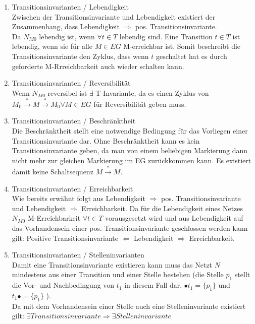 \documentclass[10pt]{scrartcl}
\begin{document}
\begin{enumerate}
\item{Transitionsinvarianten / Lebendigkeit}\\
Zwischen der Transitionsinvariante und Lebendigkeit existiert der Zusammenhang, dass Lebendigkeit $\Rightarrow$ pos. Transitionsinvariante.\\
Da $N_{M0}$ lebendig ist, wenn $\forall t \in T$ lebendig sind.
Eine Transition $t \in T$ ist lebendig, wenn sie für alle $M \in EG$ M-erreichbar ist.
Somit beschreibt die Transitionsinvariante den Zyklus, dass wenn $t$ geschaltet hat es durch geforderte M-Rrreichbarkeit auch wieder schalten kann. 

\item{Transitionsinvarianten / Reversibilität}\\
Wenn $N_{M0}$ reversibel ist $\exists$ T-Invariante, da es einen Zyklus von $M_{0} \overset{*}{\rightarrow} M  \overset{*}{\rightarrow} M_{0}  \forall M \in EG$ für Reversibilität geben muss.

\item{Transitionsinvarianten / Beschränktheit}\\
Die Beschränktheit stellt eine notwendige Bedingung für das Vorliegen einer Transitionsinvariante dar.
Ohne Beschränktheit kann es kein Transitionsinvariante geben, da man von einem beliebigen Markierung dann nicht mehr zur gleichen Markierung im EG zurückkommen kann.
Es existiert damit keine Schaltsequenz $M \overset{*}{\rightarrow} M$.

\item{Transitionsinvarianten / Erreichbarkeit}\\
Wie bereits erwähnt folgt aus Lebendigkeit $\Rightarrow$ pos. Transitionsinvariante und Lebendigkeit $\Rightarrow$ Erreichbarkeit. 
Da für die Lebendigkeit eines Netzes $N_{M0}$ M-Erreichbarkeit $\forall t \in T$ vorausgesetzt wird und aus Lebendigkeit auf das Vorhandensein einer pos. Transitionsinvariante geschlossen werden kann gilt: Positive Transitionsinvariante $\Leftarrow$ Lebendigkeit $\Rightarrow$ Erreichbarkeit.

\item{Transitionsinvarianten / Stelleninvarianten}\\
Damit eine Transitionsinvariante existieren kann muss das Netzt $N$ mindestens aus einer Transition und einer Stelle bestehen (die Stelle $p_{1}$ stellt die Vor- und Nachbedingung von $t_{1}$ in diesem Fall dar, $\bullet t_{1} = \{p_{1}\}$ und $t_{1} \bullet = \{p_{1}\}$ ).\\
Da mit dem Vorhandensein einer Stelle auch eine Stelleninvariante existiert gilt: $\exists Transitionsinvariante \Rightarrow \exists Stelleninvariante$


\end{enumerate}
\end{document}
